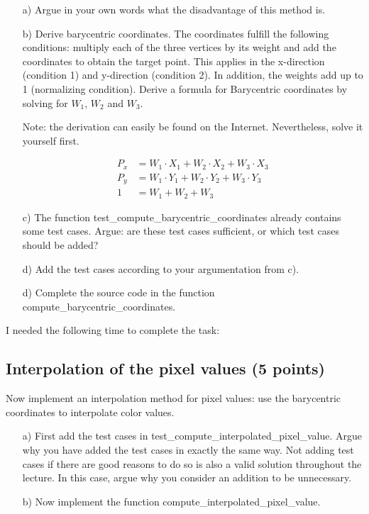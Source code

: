 \begin{enumerate}

\item[a)] Argue in your own words what the disadvantage of this method is.

\item[b)] Derive barycentric coordinates. The coordinates fulfill the following conditions: multiply each of the three vertices by its weight and add the coordinates to obtain the target point. This applies in the x-direction (condition 1) and y-direction (condition 2). In addition, the weights add up to 1 (normalizing condition). Derive a formula for
Barycentric coordinates by solving for $W_1$, $W_2$ and $W_3$.

Note: the derivation can easily be found on the Internet. Nevertheless, solve it yourself first.

\begin{align}
	P_x &= W_1 \cdot X_1 + W_2 \cdot X_2 + W_3 \cdot X_3 \\
	P_y &= W_1 \cdot Y_1 + W_2 \cdot Y_2 + W_3 \cdot Y_3 \\
	1 &= W_1 + W_2 + W_3
\end{align}

\item[c)] The function test\_compute\_barycentric\_coordinates already contains some test cases. Argue: are these test cases sufficient, or which test cases should be added? 

\item[d)] Add the test cases according to your argumentation from c). 

\item[d)] Complete the source code in the function compute\_barycentric\_coordinates. 

\end{enumerate}

I needed the following time to complete the task:

\subsection{Interpolation of the pixel values (5 points)}

Now implement an interpolation method for pixel values: use the barycentric coordinates to interpolate color values. 

\begin{enumerate}

\item[a)] First add the test cases in test\_compute\_interpolated\_pixel\_value. Argue why you have added the test cases in exactly the same way. Not adding test cases if there are good reasons to do so is also a valid solution throughout the lecture. In this case, argue why you consider an addition to be unnecessary.

\item[b)] Now implement the function compute\_interpolated\_pixel\_value.

\end{enumerate}

